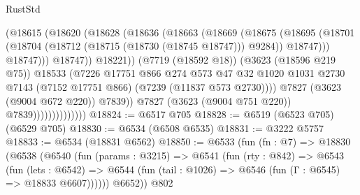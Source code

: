\begin{lexlean}{RustStd}
\begin{coremodule}
                                        (@18615
                                          (@18620
                                            (@18628
                                              (@18636
                                                (@18663
                                                  (@18669
                                                    (@18675
                                                      (@18695
                                                        (@18701
                                                          (@18704
                                                            (@18712
                                                              (@18715 (@18730 (@18745 @18747)))
                                                              @9284))
                                                          @18747)))
                                                    @18747)))
                                              @18747))
                                          @18221))
                                      (@7719 (@18592 @18))
                                      (@3623 (@18596 @219 @75))
                                      @18533
                                      (@7226
                                        @17751
                                        @866
                                        @274
                                        @573
                                        @47
                                        @32
                                        @1020
                                        @1031
                                        @2730
                                        @7143
                                        (@7152 @17751 @866)
                                        (@7239 (@11837 @573 @2730))))
                                    @7827
                                    (@3623 (@9004 @672 @220))
                                    @7839))
                                @7827
                                (@3623 (@9004 @751 @220))
                                @7839))))))))))))))
@18824 := @6517 @705
@18828 := @6519 (@6523 @705) (@6529 @705)
@18830 := @6534 (@6508 @6535)
@18831 := @3222 @5757
@18833 := @6534 (@18831 @6562)
@18850 := @6533
    (fun (fn : @7) =>
    @18830
      (@6538
        (@6540
          (fun (params : @3215) =>
          @6541
            (fun (rty : @842) =>
            @6543
              (fun (lets : @6542) =>
              @6544 (fun (tail : @1026) => @6546 (fun (Γ : @6545) => @18833 @6607))))))
        @6652))
    @802

\end{coremodule}
\end{lexlean}
